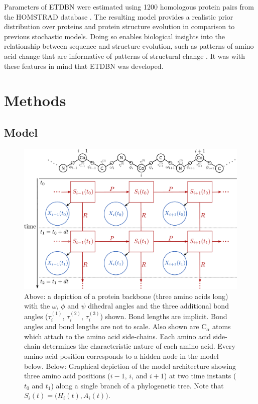 \documentclass[nogrid]{MBE}%
\begin{document}
Parameters of ETDBN were estimated using 1200 homologous protein pairs from the HOMSTRAD database \citep{mizuguchi1998homstrad}. The resulting model provides a realistic prior distribution over proteins and protein structure evolution in comparison to previous stochastic models. Doing so enables biological insights into the relationship between sequence and structure evolution, such as patterns of amino acid change that are informative of patterns of structural change \citep{grishin2001fold}. It was with these features in mind that ETDBN was developed.
\fi

\section{Methods}

\subsection{Model}
\begin{figure}
	\centering
	\includegraphics[width=1.75\columnwidth]{figures/model-structure-alt-final.pdf}
	\caption{Above: a depiction of a protein backbone (three amino acids long) with the $\omega$, $\phi$ and $\psi$ dihedral angles and the three additional bond angles ($\tau^{(1)}_{i}$, $\tau^{(2)}_{i}$, $\tau^{(3)}_{i}$) shown. Bond lengths are implicit. Bond angles and bond lengths are not to scale. Also shown are $\text{C}_{\alpha}$ atoms which attach to the amino acid side-chains. Each amino acid side-chain determines the characteristic nature of each amino acid. Every amino acid position corresponds to a hidden node in the model below.\newline
	Below: Graphical depiction of the model architecture showing three amino acid positions ($i-1$, $i$, and $i+1$) at two time instants ($t_0$ and $t_1$) along a single branch of a phylogenetic tree. Note that $S_{i}(t)=\big(H_{i}(t),A_{i}(t)\big)$.}%
	\label{fig:model-structure}%
\end{figure}
\end{document}
